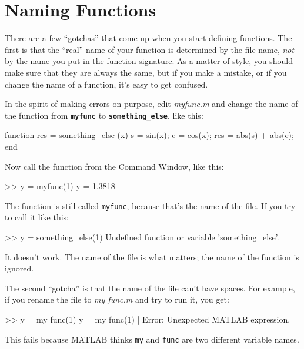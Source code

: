 
\section{Naming Functions}

There are a few ``gotchas'' that come up when you start defining functions.
The first is that the ``real'' name of your function is determined by the file name, \emph{not} by the name you put in the function signature.  As a matter of style, you
should make sure that they are always the same, but if you
make a mistake, or if you change the name of a function, it's
easy to get confused.


In the spirit of making errors on purpose, edit \emph{myfunc.m} and change the name of the function from \textbf{\lstinline{myfunc}} to \textbf{\lstinline{something_else}}, like this:

\begin{code}
function res = something_else (x)
    s = sin(x);
    c = cos(x);
    res = abs(s) + abs(c);
end
\end{code}

Now call the function from the Command Window, like this:

\begin{code}
>> y = myfunc(1)
y = 1.3818
\end{code}

The function is still called \lstinline{myfunc}, because that's the name of the file.
If you try to call it like this:

\begin{code}
>> y = something_else(1)
Undefined function or variable 'something_else'.
\end{code}

It doesn't work.  The name of the file is what matters; the name of the function is ignored.

The second ``gotcha'' is that the name of the file can't have spaces.
For example, if you rename the file to \emph{my func.m}
and try to run it, you get:

\begin{code}
>> y = my func(1)
 y = my func(1)
        |
Error: Unexpected MATLAB expression.
\end{code}

This fails because MATLAB thinks \lstinline{my} and \lstinline{func} are two different
variable names.

